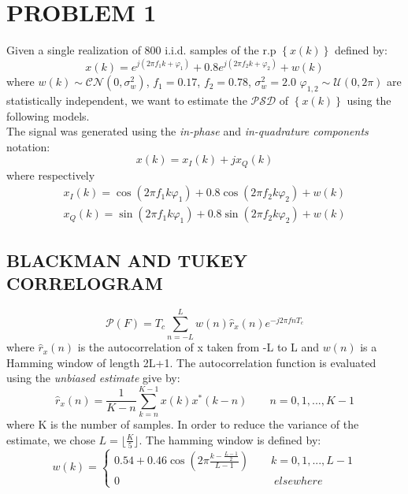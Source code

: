 \documentclass[a4paper,11pt,openright,twoside]{report}
\begin{document}
\section*{PROBLEM 1}
Given a single realization of 800 i.i.d. samples of the r.p $ \left\lbrace x(k) \right\rbrace$ defined by:
\begin{equation*}
x(k) = e^{j(2 \pi f_1k+\varphi_1)}+0.8e^{j(2 \pi f_2k+\varphi_2)}+w(k)
\end{equation*}
where $w(k)\sim \mathcal{CN}(0,\sigma_w^2)$, $f_1=0.17$, $f_2 = 0.78$, $\sigma_w^2=2.0$ $\varphi_{1,2}\sim \mathcal{U}(0,2\pi)$ are statistically independent, we want to estimate the $\mathcal{PSD}$ of $ \left\lbrace x(k) \right\rbrace$ using the following models. \\
The signal was generated using the \textit{in-phase} and \textit{in-quadrature components} notation:
\begin{equation*}
	x(k) = x_I(k) + jx_Q(k)
\end{equation*} 
where respectively
\begin{equation*}
\begin{split}
x_I(k) = \cos(2\pi f_1k\varphi_1) + 0.8\cos(2\pi f_2k\varphi_2) + w(k) \\
x_Q(k) = \sin(2\pi f_1k\varphi_1) + 0.8\sin(2\pi f_2k\varphi_2) + w(k)
\end{split}
\end{equation*}

\subsection*{BLACKMAN AND TUKEY CORRELOGRAM}
\begin{equation}
\mathcal{P}(F) = T_c \sum_{n=-L}^{L} w(n)\hat{r}_x(n)e^{-j2\pi fnT_c}
\end{equation}
where $\hat{r}_x(n)$ is the autocorrelation of x taken from -L to L and $w(n)$ is a Hamming window of length 2L+1. The autocorrelation function is evaluated using the \textit{unbiased estimate} give by:
\begin{equation*}
\hat{r}_x(n) = \frac{1}{K-n}\sum_{k=n}^{K-1}x(k)x^*(k-n) \quad \quad n = 0,1,...,K-1
\end{equation*}
where K is the number of samples. In order to reduce the variance of the estimate, we chose $L=\lfloor \frac{K}{5} \rfloor$. The hamming window is defined by:
\begin{equation}\label{ham}
w(k) = \begin{cases}
       0.54 + 0.46 \cos \left(2\pi \frac{k-\frac{L-1}{2}}{L-1} \right) \quad \quad k=0,1,...,L-1 \\
       0 \quad \quad \quad \quad \quad \quad \quad \quad \quad\quad \quad \quad \quad \quad elsewhere
       \end{cases}
\end{equation} 
\end{document}
